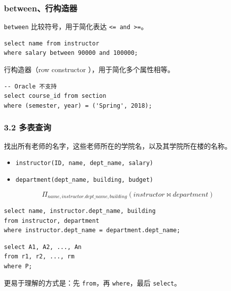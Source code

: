 \documentclass[aspectratio=169, 14pt]{beamer}
\begin{document}
\begin{frame}[fragile]
	\frametitle{between、行构造器}
	\texttt{between} 比较符号，用于简化表达 \texttt{<= and >=}。
	\begin{verbatim}    
select name from instructor
where salary between 90000 and 100000;
\end{verbatim}
	\pause
	行构造器（row constructor ），用于简化多个属性相等。
	\begin{verbatim}    
-- Oracle 不支持
select course_id from section
where (semester, year) = ('Spring', 2018);
\end{verbatim}

\end{frame}

\begin{frame}[fragile]
	\frametitle{3.2 多表查询}
	找出所有老师的名字，这些老师所在的学院名，以及其学院所在楼的名称。
	\begin{itemize}
		\item  \texttt{instructor(ID, name, dept\_name, salary)}
		\item \texttt{department(dept\_name, building, budget)}
	\end{itemize}
	\[\Pi_{name, instructor.dept\_name, building}(instructor \Join department)\]

	\begin{verbatim} 
select name, instructor.dept_name, building 
from instructor, department
where instructor.dept_name = department.dept_name;
\end{verbatim}

\end{frame}

\begin{frame}[fragile]
	\begin{verbatim} 
select A1, A2, ..., An
from r1, r2, ..., rm
where P;
    \end{verbatim}
	更易于理解的方式是：先 \texttt{from}，再 \texttt{where}，最后 \texttt{select}。
\end{frame}
\end{document}
